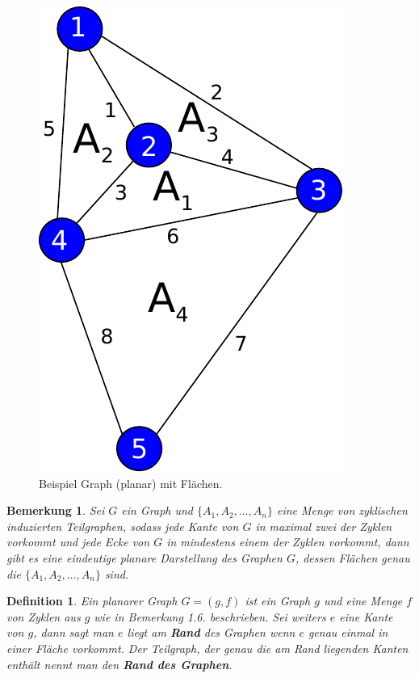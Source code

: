 \documentclass[11pt,a4paper,leqno]{report}
\newtheorem{definition}[theorem]{Definition}
\newtheorem{remark}[theorem]{Bemerkung}
\numberwithin{equation}{chapter}
\begin{document}
\begin{figure}[H]
	\begin{center}
		\includegraphics[scale=0.3]{Abbildungen/graph_1_planar_flach.pdf}
		\caption{Beispiel Graph (planar) mit Fl\"achen.}
	\end{center}
\end{figure}
\noindent
\begin{remark}
	Sei $G$ ein Graph und $\{A_1, A_2, \dots, A_n\}$ eine Menge von zyklischen induzierten Teilgraphen, sodass jede Kante von $G$ in maximal zwei der Zyklen vorkommt und jede Ecke von $G$ in mindestens einem der Zyklen vorkommt, dann gibt es eine eindeutige planare Darstellung des Graphen $G$, dessen Fl\"achen genau die $\{A_1, A_2, \dots, A_n\}$ sind.  
\end{remark}
\begin{definition}
	Ein planarer Graph $G=(g, f)$ ist ein Graph $g$ und eine Menge $f$ von Zyklen aus $g$ wie in Bemerkung 1.6. beschrieben. Sei weiters $e$ eine Kante von $g$, dann sagt man $e$ liegt am \textbf{Rand} des Graphen wenn $e$ genau einmal in einer Fl\"ache vorkommt. Der Teilgraph, der genau die am Rand liegenden Kanten enth\"alt nennt man den \textbf{Rand des Graphen}.
\end{definition}
\end{document}
